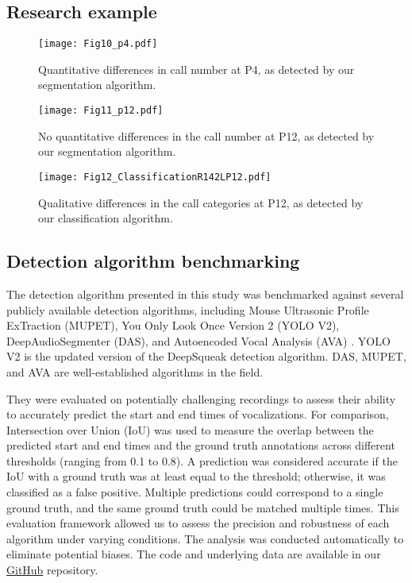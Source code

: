 \documentclass[preprint,NumberedRefs]{JASA}
\begin{document}
\subsection{Research example}
\label{research_example}

\begin{figure}[ht]
    \texttt{[image: Fig10\_p4.pdf]}
    \caption{\label{fig:USV_quant_R142L}{Quantitative differences in call number at P4, as detected by our segmentation algorithm.}}
\end{figure}

\begin{figure}[ht]
    \texttt{[image: Fig11\_p12.pdf]}
    \caption{\label{fig:USV_quant_R142Lp12}{No quantitative differences in the call number at P12, as detected by our segmentation algorithm.}}
\end{figure}

\begin{figure}[ht]
    \texttt{[image: Fig12\_ClassificationR142LP12.pdf]}
    \caption{\label{fig:USV_qual_R142Lp12}{Qualitative differences in the call categories at P12, as detected by our classification algorithm.}}
\end{figure}

\FloatBarrier

\subsection{Detection algorithm benchmarking}
\label{sec:benchmarking}

The detection algorithm presented in this study was benchmarked against several publicly available detection algorithms, including Mouse Ultrasonic Profile ExTraction (MUPET), You Only Look Once Version 2 (YOLO V2), DeepAudioSegmenter (DAS), and Autoencoded Vocal Analysis (AVA) \cite{Coffey2019-ve, Van_Segbroeck2017-bz, Goffinet2021-ju, Steinfath2021-pe}. YOLO V2 is the updated version of the DeepSqueak detection algorithm. DAS, MUPET, and AVA are well-established algorithms in the field. 

They were evaluated on potentially challenging recordings to assess their ability to accurately predict the start and end times of vocalizations. For comparison, Intersection over Union (IoU) was used to measure the overlap between the predicted start and end times and the ground truth annotations across different thresholds (ranging from 0.1 to 0.8). A prediction was considered accurate if the IoU with a ground truth was at least equal to the threshold; otherwise, it was classified as a false positive. Multiple predictions could correspond to a single ground truth, and the same ground truth could be matched multiple times. This evaluation framework allowed us to assess the precision and robustness of each algorithm under varying conditions. The analysis was conducted automatically to eliminate potential biases. The code and underlying data are available in our \href{https://github.com/Nemptis/Neonatal_USV_Detection_Classification.git}{GitHub} repository.
\end{document}
